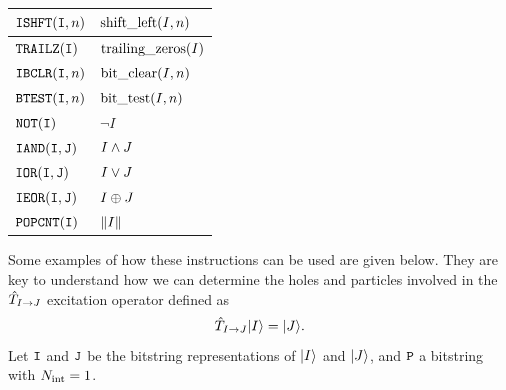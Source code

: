 \documentclass[./thesis.tex]{subfiles}
\begin{document}
\begin{table}[H]
	\begin{tabularx}{\textwidth}{X|X}
		\hline
		
		\hline
		\rule{0pt}{3ex}
		$\text{\texttt{ISHFT}}({\texttt{I}},n)$ & $\text{shift\_left}(I,n)$  \\ 
		
		\hline
		\rule{0pt}{3ex}
		$\text{\texttt{TRAILZ}}({\texttt{I}})$ & $\text{trailing\_zeros}(I)$  \\ 
		
		\hline
		\rule{0pt}{3ex}
		$\text{\texttt{IBCLR}}({\texttt{I}},n)$ & $\text{bit\_clear}(I,n)$  \\ 
		
		\hline
		\rule{0pt}{3ex}
		$\text{\texttt{BTEST}}({\texttt{I}},n)$ & $\text{bit\_test}(I,n)$  \\ 
		
		\hline
		\rule{0pt}{3ex}
		$\text{\texttt{NOT}}({\texttt{I}})$ & $\neg I $  \\ 
		
		\hline
		\rule{0pt}{3ex}
		$\text{\texttt{IAND}}({\texttt{I}},{{\texttt{J}}})$ & $I \wedge J$ \\
		
		\hline
		\rule{0pt}{3ex}
		$\text{\texttt{IOR}}({\texttt{I}},{{\texttt{J}}})$ & $I \vee J$ \\
		
		\hline
		\rule{0pt}{3ex}
		$\text{\texttt{IEOR}}({\texttt{I}},{{\texttt{J}}})$ & $I \oplus J$ \\
		
		\hline
		\rule{0pt}{3ex}
		$\text{\texttt{POPCNT}}({\texttt{I}})$ & $\norm{I}$ \\
		\hline
	\end{tabularx}
\end{table}


Some examples of how these instructions can be used are given below. They are key to understand how we can determine the holes and particles involved in the ${\hat{T}_{I \rightarrow J}}$ excitation operator defined as
\begin{equation}
{\hat{T}_{I \rightarrow J}} {\ket{I}} = {\ket{J}}.
\end{equation}
Let ${\texttt{I}}$ and ${{\texttt{J}}}$ be the bitstring representations of ${\ket{I}}$ and ${\ket{J}}$, and ${\texttt{P}}$ a bitstring with ${N_\text{int}}=1$. 
\end{document}
